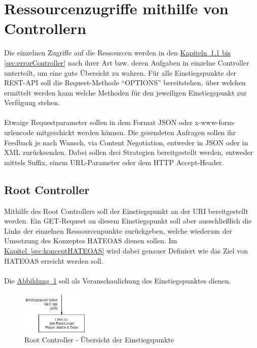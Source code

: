 \section{Ressourcenzugriffe mithilfe von Controllern}
Die einzelnen Zugriffe auf die Ressourcen werden in den \hyperref[sec:rootController, sec:errorController]{Kapiteln~\ref{sec:rootController} bis \ref{sec:errorController}} nach ihrer Art bzw. deren Aufgaben in einzelne Controller unterteilt, um eine gute Übersicht zu wahren. Für alle Einstiegspunkte der \gls{REST}-\gls{API} soll die Request-Methode \enquote{OPTIONS} bereitstehen, über welchen ermittelt werden kann welche Methoden für den jeweiligen Einstiegspunkt zur Verfügung stehen.\\
\\
Etwaige Requestparameter sollen in dem Format \gls{JSON} oder x-www-form-urlencode mitgeschickt werden können. Die gesendeten Anfragen sollen ihr Feedback je nach Wunsch, via Content Negotiation, entweder in \gls{JSON} oder in \gls{XML} zurücksenden. Dabei sollen drei Strategien bereitgestellt werden, entweder mittels Suffix, einem URL-Parameter oder dem \gls{HTTP} Accept-Header. 

\subsection{Root Controller}\label{sec:rootController}
Mithilfe des Root Controllers soll der Einstiegspunkt an der \gls{URI}  bereitgestellt werden. Ein GET-Request an diesem Einstiegspunkt soll aber ausschließlich die Links der einzelnen Ressourcenpunkte zurückgeben, welche wiederum der Umsetzung des Konzeptes HATEOAS dienen sollen. Im \hyperref[sec:konceptHATEOAS]{Kapitel~\ref{sec:konceptHATEOAS}} wird dabei genauer Definiert wie das Ziel von HATEOAS erreicht werden soll.\\
\\
Die \hyperref[fig:rootController]{Abbildung~\ref{fig:rootController}} soll als Veranschaulichung des Einstiegspunktes dienen.
\begin{figure}[htb]
	\includegraphics[width=0.28\textwidth]{images/root-controller.png}
	\caption{Root Controller - Übersicht der Einstiegspunkte}
	\label{fig:rootController}
\end{figure}

